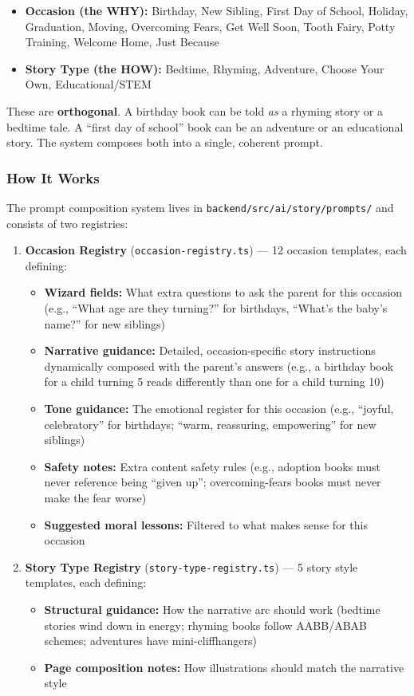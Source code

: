 \documentclass[12pt, letterpaper, oneside]{book}
\begin{document}
\begin{itemize}[leftmargin=2em]
  \item \textbf{Occasion (the WHY):} Birthday, New Sibling, First Day of School, Holiday, Graduation, Moving, Overcoming Fears, Get Well Soon, Tooth Fairy, Potty Training, Welcome Home, Just Because
  \item \textbf{Story Type (the HOW):} Bedtime, Rhyming, Adventure, Choose Your Own, Educational/STEM
\end{itemize}

These are \textbf{orthogonal}. A birthday book can be told \textit{as} a rhyming story or a bedtime tale. A ``first day of school'' book can be an adventure or an educational story. The system composes both into a single, coherent prompt.

\subsubsection*{How It Works}

The prompt composition system lives in \texttt{backend/src/ai/story/prompts/} and consists of two registries:

\begin{enumerate}[leftmargin=2em]
  \item \textbf{Occasion Registry} (\texttt{occasion-registry.ts}) --- 12 occasion templates, each defining:
    \begin{itemize}[leftmargin=1.5em]
      \item \textbf{Wizard fields:} What extra questions to ask the parent for this occasion (e.g., ``What age are they turning?'' for birthdays, ``What's the baby's name?'' for new siblings)
      \item \textbf{Narrative guidance:} Detailed, occasion-specific story instructions dynamically composed with the parent's answers (e.g., a birthday book for a child turning 5 reads differently than one for a child turning 10)
      \item \textbf{Tone guidance:} The emotional register for this occasion (e.g., ``joyful, celebratory'' for birthdays; ``warm, reassuring, empowering'' for new siblings)
      \item \textbf{Safety notes:} Extra content safety rules (e.g., adoption books must never reference being ``given up''; overcoming-fears books must never make the fear worse)
      \item \textbf{Suggested moral lessons:} Filtered to what makes sense for this occasion
    \end{itemize}
  \item \textbf{Story Type Registry} (\texttt{story-type-registry.ts}) --- 5 story style templates, each defining:
    \begin{itemize}[leftmargin=1.5em]
      \item \textbf{Structural guidance:} How the narrative arc should work (bedtime stories wind down in energy; rhyming books follow AABB/ABAB schemes; adventures have mini-cliffhangers)
      \item \textbf{Page composition notes:} How illustrations should match the narrative style
    \end{itemize}
\end{enumerate}
\end{document}
